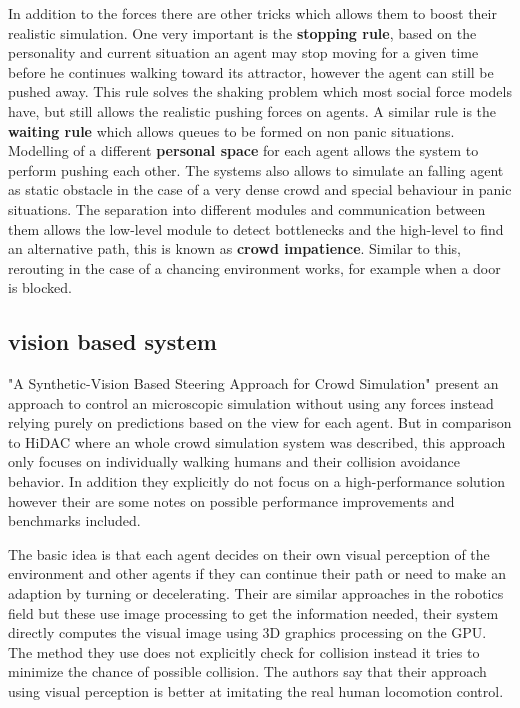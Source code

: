 \documentclass{acmsiggraph}               %
\begin{document}
In addition to the forces there are other tricks which allows them to boost their realistic simulation. 
One very important is the \textbf{stopping rule}, based on the personality and current situation an agent may stop moving for a given time before he continues walking toward its attractor, however the agent can still be pushed away. This rule solves the shaking problem which most social force models have, but still allows the realistic pushing forces on agents. 
A similar rule is the \textbf{waiting rule} which allows queues to be formed on non panic situations. Modelling of a different \textbf{personal space} for each agent allows the system to perform pushing each other. 
The systems also allows to simulate an falling agent as static obstacle in the case of a very dense crowd and special behaviour in panic situations. 
The separation into different modules and communication between them allows the low-level module to detect bottlenecks and the high-level to find an alternative path, this is known as \textbf{crowd impatience}. Similar to this, rerouting in the case of a chancing environment works, for example when a door is blocked.

\subsection{vision based system}

"A Synthetic-Vision Based Steering Approach for Crowd Simulation" \cite{ondrej_synthetic-vision_2010} present an approach to control an microscopic simulation without using any forces instead relying purely on predictions based on the view for each agent.
But in comparison to HiDAC where an whole crowd simulation system was described, this approach only focuses on individually walking humans and their collision avoidance behavior. In addition they explicitly do not focus on a high-performance solution however their are some notes on possible performance improvements and benchmarks included. 

The basic idea is that each agent decides on their own visual perception of the environment and other agents if they can continue their path or need to make an adaption by turning or decelerating. Their are similar approaches in the robotics field but these use image processing to get the information needed, their system directly computes the visual image using 3D graphics processing on the GPU.
The method they use does not explicitly check for collision instead it tries to minimize the chance of possible collision. The authors say that their approach using visual perception is better at imitating the real human locomotion control.
\end{document}
